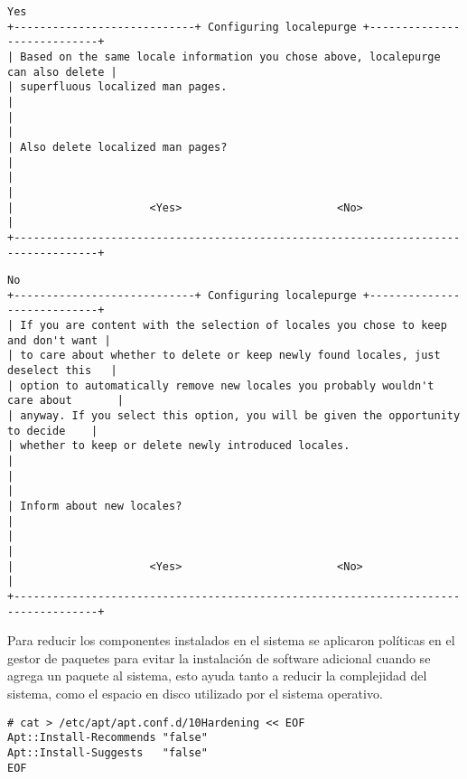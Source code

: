 {
\scriptsize
\linespread{1}
\begin{verbatim}
Yes
+----------------------------+ Configuring localepurge +----------------------------+
| Based on the same locale information you chose above, localepurge can also delete |
| superfluous localized man pages.                                                  |
|                                                                                   |
| Also delete localized man pages?                                                  |
|                                                                                   |
|                     <Yes>                        <No>                             |
+-----------------------------------------------------------------------------------+
\end{verbatim}
}

{
\scriptsize
\linespread{1}
\begin{verbatim}
No
+----------------------------+ Configuring localepurge +----------------------------+
| If you are content with the selection of locales you chose to keep and don't want |
| to care about whether to delete or keep newly found locales, just deselect this   |
| option to automatically remove new locales you probably wouldn't care about       |
| anyway. If you select this option, you will be given the opportunity to decide    |
| whether to keep or delete newly introduced locales.                               |
|                                                                                   |
| Inform about new locales?                                                         |
|                                                                                   |
|                     <Yes>                        <No>                             |
+-----------------------------------------------------------------------------------+
\end{verbatim}
}

Para reducir los componentes instalados en el sistema se aplicaron políticas en el gestor de paquetes para evitar la instalación de software adicional cuando se agrega un paquete al sistema, esto ayuda tanto a reducir la complejidad del sistema, como el espacio en disco utilizado por el sistema operativo.

{
\scriptsize
\linespread{1}
\begin{verbatim}
# cat > /etc/apt/apt.conf.d/10Hardening << EOF
Apt::Install-Recommends "false"
Apt::Install-Suggests   "false"
EOF

\end{verbatim}
}

